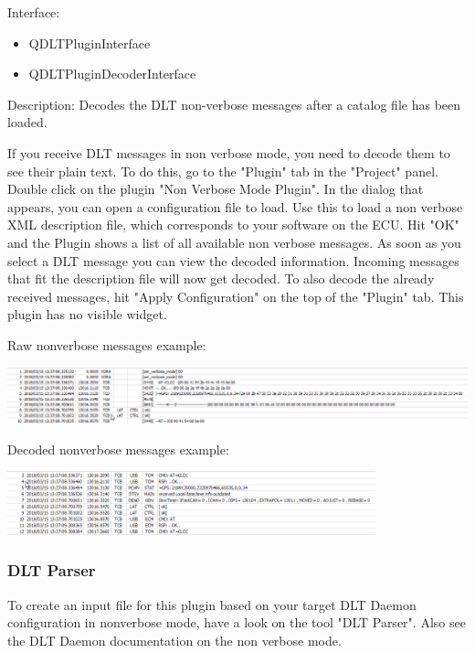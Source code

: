 \documentclass[a4paper,11pt]{article}
\begin{document}
\label{nonverbosemode}
Interface:
\begin{itemize}
    \item QDLTPluginInterface
    \item QDLTPluginDecoderInterface
\end{itemize}
Description:
    Decodes the DLT non-verbose messages after a catalog file has been loaded.


If you receive DLT messages in non verbose mode, you need to decode them
to see their plain text. To do this, go to the "Plugin" tab in the "Project" panel.
Double click on the plugin "Non Verbose Mode Plugin". In the dialog that appears,
you can open a configuration file to load. Use this to load a non verbose XML description file,
which corresponds to your software on the ECU. Hit "OK" and the Plugin shows a list of all available
non verbose messages. As soon as you select a DLT message you can view the
decoded information. Incoming messages that fit the description file will now get decoded. To also
decode the already received messages, hit "Apply Configuration" on the top of the "Plugin" tab.
This plugin has no visible widget.


\vspace{10mm}
Raw nonverbose messages example:\linebreak

\vspace{3mm}

\includegraphics[width=1.0\textwidth]{images/nonverbose_raw.png}

Decoded nonverbose messages example:\linebreak

\vspace{3mm}

\includegraphics[width=0.8\textwidth]{images/nonverbose_decoded.png}

\subsubsection{DLT Parser}
To create an input file for this plugin based on your target DLT Daemon configuration in nonverbose mode, have a look on the tool
"DLT Parser". Also see the DLT Daemon documentation on the non verbose mode.
\end{document}
